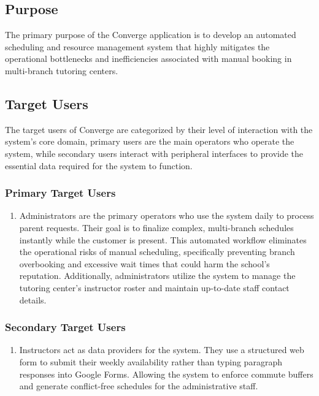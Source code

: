 \subsection{Purpose}
The primary purpose of the Converge application is to develop an automated scheduling and resource management system that highly mitigates the operational bottlenecks and inefficiencies associated with manual booking in multi-branch tutoring centers.

\subsection{Target Users}
The target users of Converge are categorized by their level of interaction with the system's core domain, primary users are the main operators who operate the system, while secondary users interact with peripheral interfaces to provide the essential data required for the system to function.

\subsubsection*{Primary Target Users}
\begin{enumerate}
    \item Administrators are the primary operators who use the system daily to process parent requests. Their goal is to finalize complex, multi-branch schedules instantly while the customer is present. This automated workflow eliminates the operational risks of manual scheduling, specifically preventing branch overbooking and excessive wait times that could harm the school's reputation. Additionally, administrators utilize the system to manage the tutoring center's instructor roster and maintain up-to-date staff contact details.
\end{enumerate}

\subsubsection*{Secondary Target Users}
\begin{enumerate}
    \item Instructors act as data providers for the system. They use a structured web form to submit their weekly availability rather than typing paragraph responses into Google Forms. Allowing the system to enforce commute buffers and generate conflict-free schedules for the administrative staff.
\end{enumerate}

